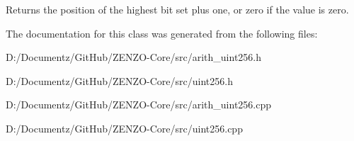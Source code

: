 Returns the position of the highest bit set plus one, or zero if the value is zero. 

The documentation for this class was generated from the following files\+:\begin{DoxyCompactItemize}
\item 
D\+:/\+Documentz/\+Git\+Hub/\+Z\+E\+N\+Z\+O-\/\+Core/src/arith\+\_\+uint256.\+h\item 
D\+:/\+Documentz/\+Git\+Hub/\+Z\+E\+N\+Z\+O-\/\+Core/src/uint256.\+h\item 
D\+:/\+Documentz/\+Git\+Hub/\+Z\+E\+N\+Z\+O-\/\+Core/src/arith\+\_\+uint256.\+cpp\item 
D\+:/\+Documentz/\+Git\+Hub/\+Z\+E\+N\+Z\+O-\/\+Core/src/uint256.\+cpp\end{DoxyCompactItemize}
